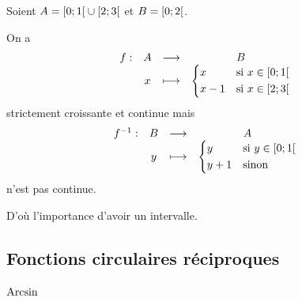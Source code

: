 \begin{ex}
Soient \(A=\left[0;1\right[\cup\left[2;3\right[\) et \(B=\left[0;2\right[\).

On a \[\begin{array}[t]{cccc}f : & A & \longrightarrow & B \\ & x & \longmapsto & \begin{dcases}x &\text{si }x\in\left[0;1\right[ \\ x-1 &\text{si }x\in\left[2;3\right[\end{dcases}\end{array}\] strictement croissante et continue mais \[\begin{array}[t]{cccc}f^{-1} : & B & \longrightarrow & A \\ & y & \longmapsto & \begin{dcases}y &\text{si }y\in\left[0;1\right[ \\ y+1 &\text{sinon}\end{dcases}\end{array}\] n'est pas continue.

D'où l'importance d'avoir un intervalle.
\end{ex}

\subsection{Fonctions circulaires réciproques}

\subsubsection{\(\operatorname{Arcsin}\)}

